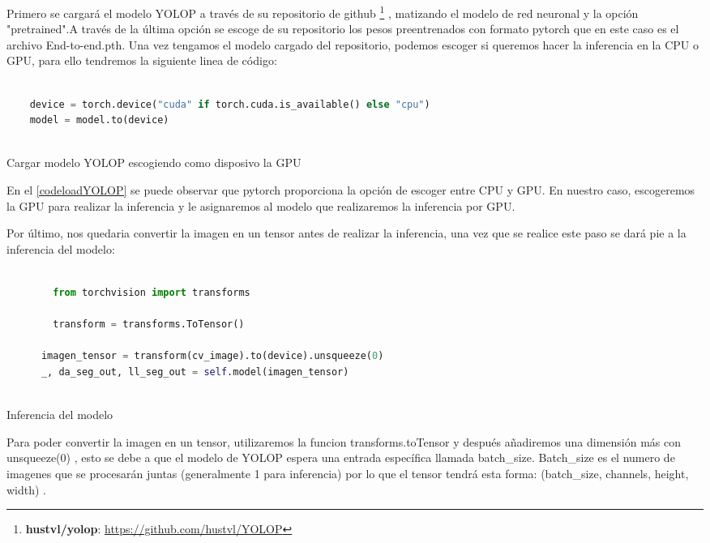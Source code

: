   Primero se cargará el modelo YOLOP a través de su repositorio de github \footnote{\textbf{hustvl/yolop}: \url{https://github.com/hustvl/YOLOP}}
  , matizando el modelo de red neuronal y la opción "pretrained".A través de la última opción se escoge de su repositorio los pesos preentrenados con formato pytorch que
  en este caso es el archivo End-to-end.pth. Una vez tengamos el modelo cargado del repositorio, podemos escoger si queremos 
  hacer la inferencia en la CPU o GPU, para ello tendremos la siguiente linea de código: 

  
  \begin{code}[h]
    \begin{lstlisting}[language=Python]
   
    device = torch.device("cuda" if torch.cuda.is_available() else "cpu")
    model = model.to(device)
  
    \end{lstlisting}
    \caption[Cargar modelo YOLOP escogiendo como disposivo la GPU]{Cargar modelo YOLOP escogiendo como disposivo la GPU}
    \label{cod:codeloadYOLOP}
    \end{code}  

    En el \ref{codeloadYOLOP} se puede observar que pytorch proporciona la opción de escoger entre CPU y GPU. En nuestro caso, escogeremos
    la GPU para realizar la inferencia y le asignaremos al modelo que realizaremos la inferencia por GPU. \newline

    Por último, nos quedaria convertir la imagen en un tensor antes de realizar la inferencia, una vez que se realice este paso
    se dará pie a la inferencia del modelo: 

    \begin{code}[h]
      \begin{lstlisting}[language=Python]
     
        from torchvision import transforms

        transform = transforms.ToTensor() 
                    
      imagen_tensor = transform(cv_image).to(device).unsqueeze(0)
      _, da_seg_out, ll_seg_out = self.model(imagen_tensor)
    
      \end{lstlisting}
      \caption[Inferencia del modelo]{Inferencia del modelo}
      \label{cod:codejemplo}
      \end{code}  

    Para poder convertir la imagen en un tensor, utilizaremos la funcion transforms.toTensor y después añadiremos una dimensión más con unsqueeze(0) , esto se debe 
    a que el modelo de YOLOP espera una entrada específica llamada batch\_size. Batch\_size es el numero de imagenes que se procesarán juntas
    (generalmente 1 para inferencia) por lo que el tensor tendrá esta forma: (batch\_size, channels, height, width) \break. 

